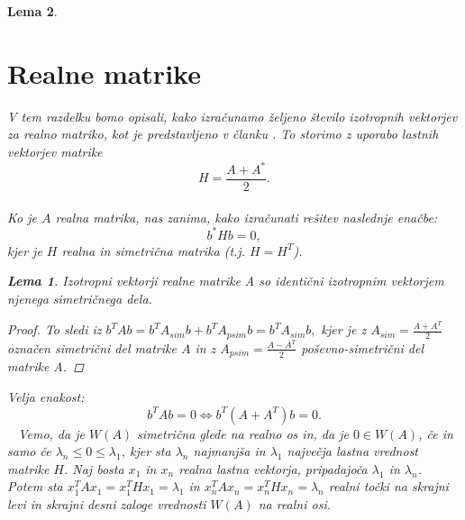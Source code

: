 \documentclass[12pt,a4paper]{amsart}\usepackage[slovene]{babel}%
\theoremstyle{definition}\newtheorem{definicija}{Definicija}[section]\newtheorem{primer}[definicija]{Primer}\newtheorem{opomba}[definicija]{Opomba}
\theoremstyle{plain}\newtheorem{lema}[definicija]{Lema}\newtheorem{izrek}[definicija]{Izrek}\newtheorem{trditev}[definicija]{Trditev}\newtheorem{posledica}[definicija]{Posledica}
\begin{document}
{\begin{lema}
\section{Realne matrike}\label{Realne matrike}V tem razdelku bomo opisali, kako izračunamo željeno število izotropnih vektorjev za realno matriko, kot je predstavljeno v članku \cite{meurant}. To storimo z uporabo lastnih vektorjev matrike $$H=\frac{A+A^\ast}{2}.$$\\Ko je $A$ realna matrika, nas zanima, kako izračunati rešitev naslednje enačbe:\begin{equation}\label{eq:realna}b^\ast Hb=0,\end{equation}kjer je $H$ realna in simetrična matrika (t.j. $H=H^T$).\begin{lema} \cite{lipkin}Izotropni vektorji realne matrike A so identični izotropnim vektorjem njenega simetričnega dela.\end{lema} \begin{proof}To sledi iz $b^T Ab=b^T A_{sim} b +b^T A_{psim} b=b^T A_{sim} b,$ kjer je z $A_{sim}=\frac{A+A^T}{2}$ označen simetrični del matrike $A$ in z $A_{psim}=\frac{A-A^T}{2}$ poševno-simetrični del matrike A.\end{proof}Velja enakost:$$b^T Ab=0 \Leftrightarrow b^T (A+A^T)b=0.$$  Vemo, da je $W(A)$ simetrična glede na realno os in, da je $0 \in W(A)$, če in samo če $\lambda_n\le0\le\lambda_1$, kjer sta $\lambda_n$ najmanjša in $\lambda_1$ največja lastna vrednost matrike $H$. Naj bosta $x_1$ in $x_n$ realna lastna vektorja, pripadajoča $\lambda_1$ in $\lambda_n$.  Potem sta $x_1^T Ax_1=x_1^T Hx_1=\lambda_1$ in $x_n^T Ax_n=x_n^T Hx_n=\lambda_n$ realni točki na skrajni levi in skrajni desni zaloge vrednosti $W(A)$ na realni osi.\\

\end{lema}}
\end{document}
